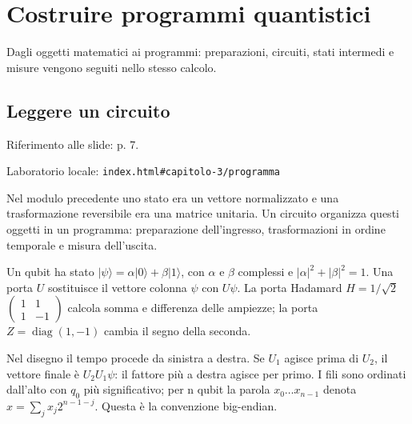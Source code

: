 \setcounter{chapter}{2}
\chapter{Costruire programmi quantistici}
\label{chapter-3}

Dagli oggetti matematici ai programmi: preparazioni, circuiti, stati intermedi e misure vengono seguiti nello stesso calcolo.\par



\Needspace{.43\textheight}
\section{Leggere un circuito}
\label{c3-programma}

{\sffamily\small\color{Ink!70} Riferimento alle slide: p. 7.\par}

{\sffamily\small\color{Ink!70} Laboratorio locale: \nolinkurl{index.html#capitolo-3/programma}\par}

Nel modulo precedente uno stato era un vettore normalizzato e una trasformazione reversibile era una matrice unitaria. Un circuito organizza questi oggetti in un programma: preparazione dell'ingresso, trasformazioni in ordine temporale e misura dell'uscita.\par

Un qubit ha stato \(|\psi \rangle =\alpha |0\rangle +\beta |1\rangle \), con \(\alpha \) e \(\beta \) complessi e \(|\alpha |^{2}+|\beta |^{2}=1\). Una porta \(U\) sostituisce il vettore colonna \(\psi \) con \(U\psi \). La porta Hadamard \(H=1/\sqrt{2}\) \(\begin{pmatrix}1&1\\1&- 1\end{pmatrix}\) calcola somma e differenza delle ampiezze; la porta \(Z=\operatorname{diag}(1,\allowbreak - 1)\) cambia il segno della seconda.\par

Nel disegno il tempo procede da sinistra a destra. Se \(U_{1}\) agisce prima di \(U_{2}\), il vettore finale è \(U_{2}U_{1}\psi \): il fattore più a destra agisce per primo. I fili sono ordinati dall'alto con \(q_{0}\) più significativo; per n qubit la parola \(x_{0}\ldots x_{n-1}\) denota \(x=\sum _{j}x_{j}2^{n- 1- j}\). Questa è la convenzione big-endian.\par

